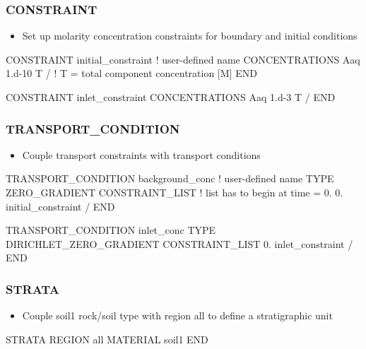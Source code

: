 \documentclass{beamer}
\newcommand\redcomment[1]{{{\color{red} #1}}}
\newcommand\bluecomment[1]{{{\color{blue} #1}}}
\newcommand\greencomment[1]{{{\color{green} #1}}}
\begin{document}
\begin{frame}[fragile]\frametitle{CONSTRAINT}

\begin{itemize}
  \item Set up molarity concentration constraints for boundary and initial conditions
\end{itemize}

\begin{semiverbatim}

CONSTRAINT initial_constraint \bluecomment{! user-defined name}
  CONCENTRATIONS
    Aaq   1.d-10   T
  /      \bluecomment{! T = total component concentration [M]}
END

CONSTRAINT inlet_constraint
  CONCENTRATIONS
    Aaq   1.d-3    T
  /
END

\end{semiverbatim}

\end{frame}

\begin{frame}[fragile]\frametitle{TRANSPORT\_CONDITION}


\begin{itemize}
  \item Couple transport constraints with transport conditions
\end{itemize}
\begin{semiverbatim}
TRANSPORT_CONDITION background_conc \bluecomment{! user-defined name}
  TYPE ZERO_GRADIENT
  CONSTRAINT_LIST
    \bluecomment{! list has to begin at time = \redcomment{0.}}
    0. initial_constraint
  /
END

TRANSPORT_CONDITION inlet_conc
  TYPE DIRICHLET_ZERO_GRADIENT
  CONSTRAINT_LIST
    0. inlet_constraint
  /
END
\end{semiverbatim}

\end{frame}

\begin{frame}[fragile]\frametitle{STRATA}

\begin{itemize}
\item Couple \greencomment{soil1} rock/soil type with region \greencomment{all} to define a stratigraphic unit
\end{itemize}

\begin{semiverbatim}

STRATA
  REGION all
  MATERIAL soil1
END


\end{semiverbatim}

\end{frame}
\end{document}
